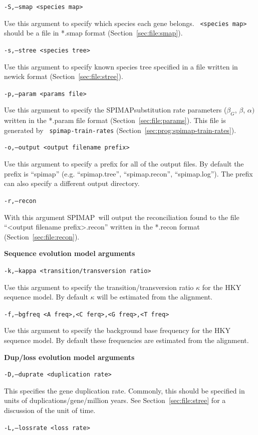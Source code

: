 \documentclass[11pt]{article}
\newcommand{\secref}[1]{Section~\ref{#1}}
\newcommand{\spimap}{{\sf\scshape SPIMAP}}
\begin{document}
{\tt -S,--smap  <species map>}

Use this argument to specify which species each gene belongs.  {\tt
<species map>} should be a file in *.smap format
(\secref{sec:file:smap}).

{\tt -s,--stree  <species tree>}

Use this argument to specify known species tree specified in a file
{\tt <species tree>} written in newick format
(\secref{sec:file:stree}).

{\tt -p,--param  <params file>}

Use this argument to specify the \spimap substitution rate parameters
($\beta_G$, $\beta$, $\alpha)$ written in the *.param file format
(\secref{sec:file:params}).  This file is generated by {\tt
spimap-train-rates} (\secref{sec:prog:spimap-train-rates}).

{\tt -o,--output  <output filename prefix>}

Use this argument to specify a prefix for all of the output files.  By 
default the prefix is ``spimap'' (e.g. ``spimap.tree'', ``spimap.recon'', 
``spimap.log'').  The prefix can also specify a different output directory.

{\tt -r,--recon}

With this argument \spimap\ will output the reconciliation found to the 
file ``<output filename prefix>.recon'' written in the *.recon format 
(\secref{sec:file:recon}).


{\bf Sequence evolution model arguments}

{\tt -k,--kappa  <transition/transversion ratio>}

Use this argument to specify the transition/transversion ratio $\kappa$
for the HKY sequence model.  By default $\kappa$ will be estimated 
from the alignment.

{\tt -f,--bgfreq  <A freq>,<C ferq>,<G freq>,<T freq>}

Use this argument to specify the background base frequency for the 
HKY sequence model.  By default these frequencies are estimated from the
alignment.


{\bf Dup/loss evolution model arguments}

{\tt -D,--duprate  <duplication rate>}

This specifies the gene duplication rate.  Commonly, this should be 
specified in units of duplications/gene/million years.  See 
\secref{sec:file:stree} for a discussion of the unit of time.

{\tt -L,--lossrate  <loss rate>}
\end{document}

